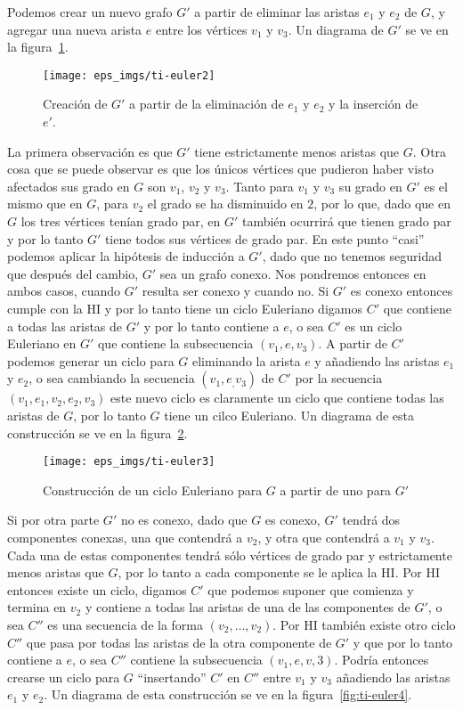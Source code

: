 \begin{teorema}
\begin{demostracion}
\begin{inducciondemo}
  Podemos crear un nuevo grafo $G'$ a partir de eliminar las aristas $e_1$ y $e_2$ de $G$, y agregar una nueva arista $e$ entre los vértices $v_1$ y $v_3$.
  Un diagrama de $G'$ se ve en la figura~\ref{fig:ti-euler2}.
  \begin{figure}[h!]
  \centering
  \texttt{[image: eps\_imgs/ti-euler2]}
  \caption{Creación de $G'$ a partir de la eliminación de $e_1$ y $e_2$ y la inserción de $e'$.}
  \label{fig:ti-euler2}
  \end{figure}
  La primera observación es que $G'$ tiene estrictamente menos aristas que $G$.
  Otra cosa que se puede observar es que los únicos vértices que pudieron haber visto afectados sus grado en $G$ son $v_1$, $v_2$ y $v_3$.
  Tanto para $v_1$ y $v_3$ su grado en $G'$ es el mismo que en $G$, para $v_2$ el grado se ha disminuido en $2$, por lo que, dado que en $G$ los tres vértices tenían grado par, en $G'$ también ocurrirá que tienen grado par y por lo tanto $G'$ tiene todos sus vértices de grado par.
  En este punto ``casi'' podemos aplicar la hipótesis de inducción a $G'$, dado que no tenemos seguridad que después del cambio, $G'$ sea un grafo conexo. 
  Nos pondremos entonces en ambos casos, cuando $G'$ resulta ser conexo y cuando no.
  Si $G'$ es conexo entonces cumple con la HI y por lo tanto tiene un ciclo Euleriano digamos $C'$ que contiene a todas las aristas de $G'$ y por lo tanto contiene a $e$, o sea $C'$ es un ciclo Euleriano en $G'$ que contiene la subsecuencia $(v_1,e,v_3)$.
  A partir de $C'$ podemos generar un ciclo para $G$ eliminando la arista $e$ y añadiendo las aristas $e_1$ y $e_2$, o sea cambiando la secuencia $(v_1,e_,v_3)$ de $C'$ por la secuencia $(v_1,e_1,v_2,e_2,v_3)$ este nuevo ciclo es claramente un ciclo que contiene todas las aristas de $G$, por lo tanto $G$ tiene un cilco Euleriano.
  Un diagrama de esta construcción se ve en la figura~\ref{fig:ti-euler3}.
  \begin{figure}[h!]
  \centering
  \texttt{[image: eps\_imgs/ti-euler3]}
  \caption{Construcción de un ciclo Euleriano para $G$ a partir de uno para $G'$}
  \label{fig:ti-euler3}
  \end{figure}
  
  Si por otra parte $G'$ no es conexo, dado que $G$ es conexo, $G'$ tendrá dos componentes conexas, una que contendrá a $v_2$, y otra que contendrá a $v_1$ y $v_3$.
  Cada una de estas componentes tendrá sólo vértices de grado par y estrictamente menos aristas que $G$, por lo tanto a cada componente se le aplica la HI.
  Por HI entonces existe un ciclo, digamos $C'$ que podemos suponer que comienza y termina en $v_2$ y contiene a todas las aristas de una de las componentes de $G'$, o sea $C''$ es una secuencia de la forma $(v_2,\ldots,v_2)$.
  Por HI también existe otro ciclo $C''$ que pasa por todas las aristas de la otra componente de $G'$ y que por lo tanto contiene a $e$, o sea $C''$ contiene la subsecuencia $(v_1,e,v,3)$.
  Podría entonces crearse un ciclo para $G$ ``insertando'' $C'$ en $C''$ entre $v_1$ y $v_3$ añadiendo las aristas $e_1$ y $e_2$.
  Un diagrama de esta construcción se ve en la figura~\ref{fig:ti-euler4}.
  

\end{inducciondemo}
\end{demostracion}
\end{teorema}
